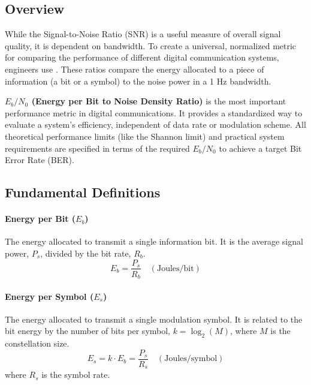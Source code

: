\subsection{Overview}

While the Signal-to-Noise Ratio (SNR) is a useful measure of overall signal quality, it is dependent on bandwidth. To create a universal, normalized metric for comparing the performance of different digital communication systems, engineers use . These ratios compare the energy allocated to a piece of information (a bit or a symbol) to the noise power in a 1 Hz bandwidth.

\begin{keyconcept}
    \textbf{$E_b/N_0$ (Energy per Bit to Noise Density Ratio)} is the most important performance metric in digital communications. It provides a standardized way to evaluate a system's efficiency, independent of data rate or modulation scheme. All theoretical performance limits (like the Shannon limit) and practical system requirements are specified in terms of the required $E_b/N_0$ to achieve a target Bit Error Rate (BER).
\end{keyconcept}


\subsection{Fundamental Definitions}

\paragraph{Energy per Bit ($E_b$)}
The energy allocated to transmit a single information bit. It is the average signal power, $P_s$, divided by the bit rate, $R_b$.
\begin{equation}
    E_b = \frac{P_s}{R_b} \quad (\text{Joules/bit})
\end{equation}

\paragraph{Energy per Symbol ($E_s$)}
The energy allocated to transmit a single modulation symbol. It is related to the bit energy by the number of bits per symbol, $k = \log_2(M)$, where $M$ is the constellation size.
\begin{equation}
    E_s = k \cdot E_b = \frac{P_s}{R_s} \quad (\text{Joules/symbol})
\end{equation}
where $R_s$ is the symbol rate.

